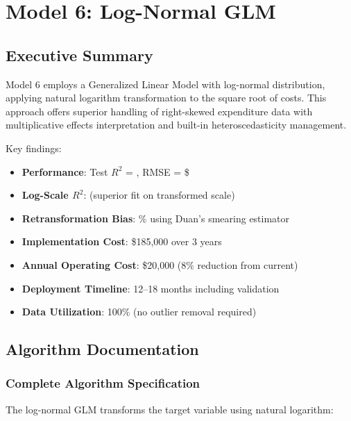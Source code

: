 \chapter{Model 6: Log-Normal GLM}\label{ch:model6}



\section{Executive Summary}

Model 6 employs a Generalized Linear Model with log-normal distribution, applying natural logarithm transformation to the square root of costs. This approach offers superior handling of right-skewed expenditure data with multiplicative effects interpretation and built-in heteroscedasticity management.

Key findings:
\begin{itemize}
    \item \textbf{Performance}: Test $R^2$ = \ModelSixRSquaredTest{}, RMSE = \$\ModelSixRMSETest{}
    \item \textbf{Log-Scale $R^2$}: \ModelSixRSquaredLogScale{} (superior fit on transformed scale)
    \item \textbf{Retransformation Bias}: \ModelSixSmearingBias{}\% using Duan's smearing estimator
    \item \textbf{Implementation Cost}: \$185,000 over 3 years
    \item \textbf{Annual Operating Cost}: \$20,000 (8\% reduction from current)
    \item \textbf{Deployment Timeline}: 12--18 months including validation
    \item \textbf{Data Utilization}: 100\% (no outlier removal required)
\end{itemize}

\section{Algorithm Documentation}

\subsection{Complete Algorithm Specification}

The log-normal GLM transforms the target variable using natural logarithm:

